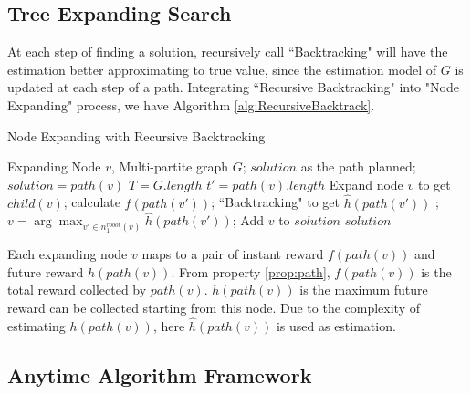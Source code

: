 \documentclass[12pt]{article}
\begin{document}


\subsection{Tree Expanding Search}

At each step of finding a solution, recursively call ``Backtracking" will have the estimation better approximating to true value, since the estimation model of $ G $ is updated at each step of a path. Integrating ``Recursive Backtracking" into "Node Expanding" process, we have Algorithm \ref{alg:RecursiveBacktrack}. 

\begin{algorithm}
\caption{Node Expanding with Recursive Backtracking}
\label{alg:RecursiveBacktrack}
\begin{algorithmic}
\REQUIRE 
Expanding Node $ v $, Multi-partite graph $ G $;
\ENSURE $ solution $ as the path planned;
\STATE $ solution = path(v) $ 
\STATE $ T = G.length $
\STATE $ t' = path(v).length $
\STATE  Expand node $ v $ to get $ child(v) $;
\STATE  calculate $ f(path(v')) $;
\STATE  ``Backtracking" to get $ \hat{h}(path(v')) $ ;
\ENDFOR
\STATE  $ v = \arg \max_{v' \in n^{robot}_{1}(v)} \hat{h}(path(v')) $;
\STATE  Add $ v $ to $ solution $
\ENDFOR 
\RETURN $ solution $
\end{algorithmic}
\end{algorithm}

Each expanding node $ v $ maps to a pair of instant reward $f(path(v)) $ and future reward $ h(path(v)) $. From property \ref{prop:path}, $ f(path(v)) $ is the total reward collected by $ path(v) $. $ h(path(v)) $ is the maximum future reward can be collected starting from this node. Due to the complexity of estimating $ h(path(v)) $, here $ \hat{h}(path(v)) $ is used as estimation.

\subsection{Anytime Algorithm Framework}
\end{document}
